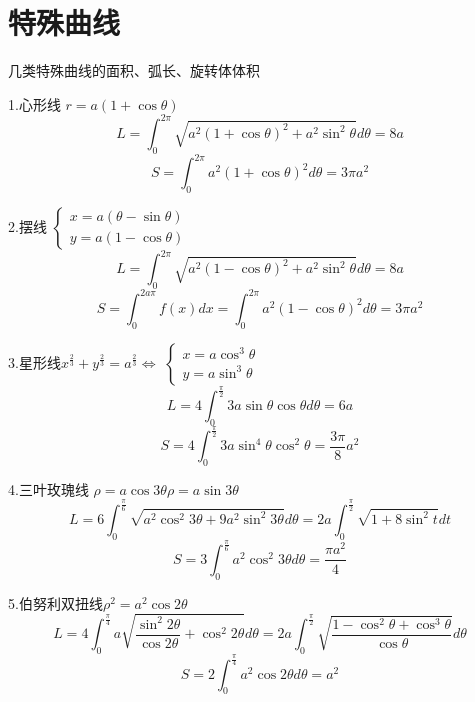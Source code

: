 \section{特殊曲线}

\begin{definition}\label{def: 常用曲线}
	几类特殊曲线的面积、弧长、旋转体体积
	
	1.心形线 \quad $r=a(1+\cos \theta)$
	$$L=\int_{0}^{2\pi}\sqrt{a^2(1+\cos \theta)^2+a^2\sin^2\theta}d\theta=8a$$
	$$S=\int_{0}^{2\pi}a^2(1+\cos \theta)^2d\theta=3\pi a^2$$
	
	2.摆线\quad 
	$\left\lbrace
	\begin{array}{l}
		x=a(\theta-\sin \theta)\\
		y=a(1-\cos \theta)
	\end{array}
	 \right. $
	 $$L=\int_{0}^{2\pi}\sqrt{a^2(1-\cos \theta)^2+a^2\sin^2\theta}d\theta=8a$$
	 $$S=\int_{0}^{2a\pi}f(x)dx=\int_{0}^{2\pi}a^2(1-\cos \theta)^2d\theta=3\pi a^2$$
	
	3.星形线\quad $x^{\frac{2}{3}}+y^{\frac{2}{3}}=a^{\frac{2}{3}}\Leftrightarrow$
	$\left\lbrace
	\begin{array}{l}
		x=a\cos^3\theta\\
		y=a\sin^3\theta
	\end{array}
	 \right. $
	$$L=4\int_{0}^{\frac{\pi}{2}}3a\sin\theta\cos\theta d\theta=6a$$
	$$S=4\int_{0}^{\frac{\pi}{2}}3a\sin^4\theta\cos^2\theta=\frac{3\pi}{8}a^2$$
	
	4.三叶玫瑰线 \quad $\rho=a\cos 3\theta$\quad $\rho=a\sin 3\theta$
	$$L=6\int_{0}^{\frac{\pi}{6}}\sqrt{a^2\cos^2 3\theta+9a^2\sin^2 3\theta}d\theta=2a\int_{0}^{\frac{\pi}{2}}\sqrt{1+8\sin^2 t}dt$$
	$$S=3\int_{0}^{\frac{\pi}{6}}a^2\cos^2 3\theta d\theta=\frac{\pi a^2}{4}$$
	
	5.伯努利双扭线\quad $\rho^2=a^2\cos 2\theta$
	$$L=4\int_{0}^{\frac{\pi}{4}}a\sqrt{\frac{\sin^2 2\theta}{\cos 2\theta}+\cos^2 2\theta}d\theta=2a\int_{0}^{\frac{\pi}{2}}\sqrt{\dfrac{1-\cos^{2}\theta +\cos^{3}\theta}{\cos\theta}} d\theta$$
	$$S=2\int_{0}^{\frac{\pi}{4}}a^2\cos 2\theta d\theta=a^2$$
\end{definition}
